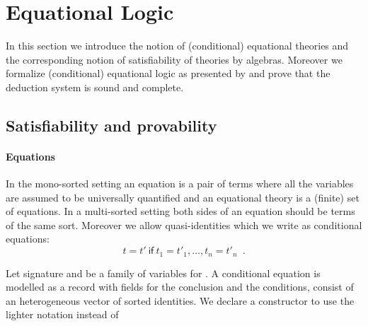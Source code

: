 \section{Equational Logic}
\label{sec:eqlog}

In this section we introduce the notion of (conditional) equational
theories and the corresponding notion of satisfiability of theories
by algebras. Moreover we formalize (conditional) equational logic as
presented by \cite{goguen2005specifying} and prove that
the deduction system is sound and complete.

\subsection{Satisfiability and provability}

\paragraph*{Equations} In the mono-sorted setting an equation is a pair
of terms where all the variables are assumed to be universally
quantified and an equational theory is a (finite) set of equations.
In a  multi-sorted setting both sides of an equation should be terms
of the same sort. Moreover we allow quasi-identities which we
write as conditional equations:
\[ t = t'\ \mathsf{if} \  t_1 = t'_1, \ldots, t_n = t'_n \enspace . \]

Let signature  and  be a family of variables
for . A conditional equation is modelled as a record
with fields for the conclusion and the conditions, consist of an
heterogeneous vector of sorted identities. We declare a constructor to
use the lighter notation
\AgdaSpace{}\AgdaSpace{}
\AgdaSpace{} instead of
\AgdaSpace{}%
\AgdaSymbol{\{}\AgdaSpace{}%
\AgdaSymbol{=}\AgdaSpace{}%
\AgdaSpace{}%
\AgdaSymbol{;}\AgdaSpace{}%
\AgdaSpace{}%
\AgdaSymbol{=}\AgdaSpace{}%
\AgdaSymbol{\}}

